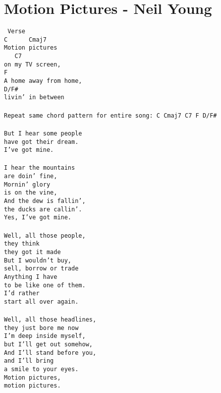 \newpage
\section{Motion Pictures - Neil Young}
\label{Motion Pictures - Neil Young}
\texttt{\lbrack\ Verse\rbrack\\
C\ \ \ \ \ \ Cmaj7\\
Motion\ pictures\\
\ \ \ C7\\
on\ my\ TV\ screen,\\
F\\
A\ home\ away\ from\ home,\\
D/F\#\\
livin'\ in\ between\\
\\
Repeat\ same\ chord\ pattern\ for\ entire\ song:\ C\ Cmaj7\ C7\ F\ D/F\#\ \\
\\
But\ I\ hear\ some\ people\\
have\ got\ their\ dream.\\
I've\ got\ mine.\\
\\
I\ hear\ the\ mountains\\
are\ doin'\ fine,\\
Mornin'\ glory\\
is\ on\ the\ vine,\\
And\ the\ dew\ is\ fallin',\\
the\ ducks\ are\ callin'.\\
Yes,\ I've\ got\ mine.\\
\\
Well,\ all\ those\ people,\\
they\ think\\
they\ got\ it\ made\\
But\ I\ wouldn't\ buy,\\
sell,\ borrow\ or\ trade\\
Anything\ I\ have\\
to\ be\ like\ one\ of\ them.\\
I'd\ rather\\
start\ all\ over\ again.\\
\\
Well,\ all\ those\ headlines,\\
they\ just\ bore\ me\ now\\
I'm\ deep\ inside\ myself,\\
but\ I'll\ get\ out\ somehow,\\
And\ I'll\ stand\ before\ you,\\
and\ I'll\ bring\\
a\ smile\ to\ your\ eyes.\\
Motion\ pictures,\\
motion\ pictures.\\
\\}

